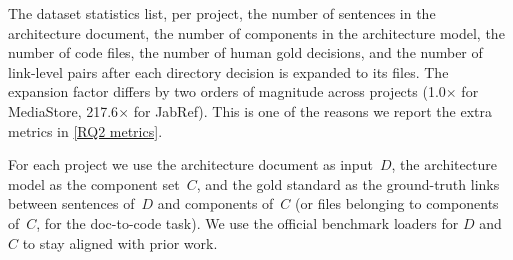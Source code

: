 

The dataset statistics list, per project, the number of sentences in the architecture document, the number of components in the architecture model, the number of code files, the number of human gold decisions, and the number of link-level pairs after each directory decision is expanded to its files.
The expansion factor differs by two orders of magnitude across projects (1.0$\times$ for MediaStore, 217.6$\times$ for JabRef).
This is one of the reasons we report the extra metrics in \ref{RQ2 metrics}.

For each project we use the architecture document as input~$D$, the architecture model as the component set~$C$, and the gold standard as the ground-truth links between sentences of~$D$ and components of~$C$ (or files belonging to components of~$C$, for the doc-to-code task).
We use the official benchmark loaders for $D$ and $C$ to stay aligned with prior work.
